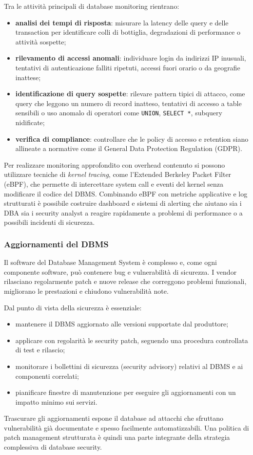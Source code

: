 Tra le attività principali di database monitoring rientrano:
\begin{itemize}
    \item \textbf{analisi dei tempi di risposta}: misurare la latency delle query e delle transaction per identificare colli di bottiglia, degradazioni di performance o attività sospette;
    \item \textbf{rilevamento di accessi anomali}: individuare login da indirizzi IP inusuali, tentativi di autenticazione falliti ripetuti, accessi fuori orario o da geografie inattese;
    \item \textbf{identificazione di query sospette}: rilevare pattern tipici di attacco, come query che leggono un numero di record inatteso, tentativi di accesso a table sensibili o uso anomalo di operatori come \texttt{UNION}, \texttt{SELECT *}, subquery nidificate;
    \item \textbf{verifica di compliance}: controllare che le policy di accesso e retention siano allineate a normative come il General Data Protection Regulation (GDPR).
\end{itemize}

Per realizzare monitoring approfondito con overhead contenuto si possono utilizzare tecniche di \textit{kernel tracing}, come l'Extended Berkeley Packet Filter (eBPF), che permette di intercettare system call e eventi del kernel senza modificare il codice del DBMS.
Combinando eBPF con metriche applicative e log strutturati è possibile costruire dashboard e sistemi di alerting che aiutano sia i DBA sia i security analyst a reagire rapidamente a problemi di performance o a possibili incidenti di sicurezza.

\subsubsection{Aggiornamenti del DBMS}

Il software del Database Management System è complesso e, come ogni componente software, può contenere bug e vulnerabilità di sicurezza.
I vendor rilasciano regolarmente patch e nuove release che correggono problemi funzionali, migliorano le prestazioni e chiudono vulnerabilità note.

Dal punto di vista della sicurezza è essenziale:
\begin{itemize}
    \item mantenere il DBMS aggiornato alle versioni supportate dal produttore;
    \item applicare con regolarità le security patch, seguendo una procedura controllata di test e rilascio;
    \item monitorare i bollettini di sicurezza (security advisory) relativi al DBMS e ai componenti correlati;
    \item pianificare finestre di manutenzione per eseguire gli aggiornamenti con un impatto minimo sui servizi.
\end{itemize}

Trascurare gli aggiornamenti espone il database ad attacchi che sfruttano vulnerabilità già documentate e spesso facilmente automatizzabili.
Una politica di patch management strutturata è quindi una parte integrante della strategia complessiva di database security.
